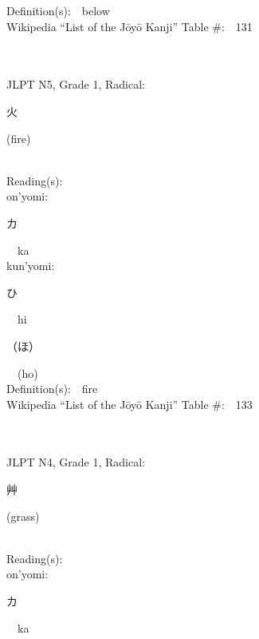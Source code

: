 \begin{multicols}{2}
Definition(s):\ \ below \\
Wikipedia ``List of the J\=oy\=o Kanji'' Table \#:\ \ 131 \\
\ \ \\
{\fontsize{34pt}{40pt}  }\ \ \\  %
{JLPT N5, Grade 1, Radical:\ \ {\begin{CJK}{UTF8}{min} 火 \end{CJK}} (fire) } \\
Reading(s):\ \ \\
{\hspace*{1em}}on'yomi:\ \ \\
{\hspace*{2em}}{\begin{CJK}{UTF8}{min} カ \end{CJK}}\ \ ka\ \ \\
{\hspace*{1em}}kun'yomi:\ \ \\
{\hspace*{2em}}{\begin{CJK}{UTF8}{min} ひ \end{CJK}}\ \ hi\ \ \\
{\hspace*{2em}}{\begin{CJK}{UTF8}{min} （ほ） \end{CJK}}\ \ (ho)\ \ \\
Definition(s):\ \ fire \\
Wikipedia ``List of the J\=oy\=o Kanji'' Table \#:\ \ 133 \\
\ \ \\
{\fontsize{34pt}{40pt}  }\ \ \\  %
{JLPT N4, Grade 1, Radical:\ \ {\begin{CJK}{UTF8}{min} 艸 \end{CJK}} (grass) } \\
Reading(s):\ \ \\
{\hspace*{1em}}on'yomi:\ \ \\
{\hspace*{2em}}{\begin{CJK}{UTF8}{min} カ \end{CJK}}\ \ ka\ \ \\

\end{multicols}
